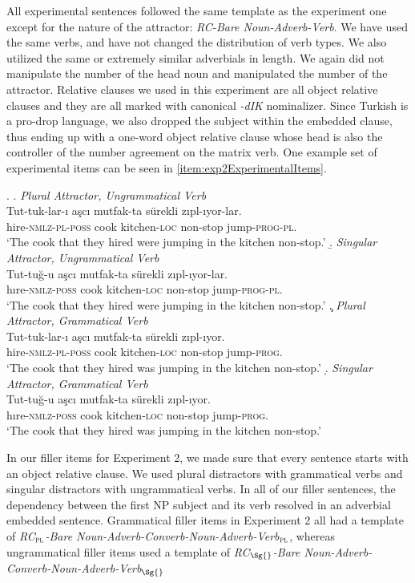 \documentclass[doc,a4paper,man,natbib,floatsintext,noextraspace]{apa6}\usepackage[]{graphicx}\usepackage[]{color}
\begin{document}
All experimental sentences followed the same template as the experiment one except for the nature of the attractor: \textit{RC-Bare Noun-Adverb-Verb}. 
We have used the same verbs, and have not changed the distribution of verb types. We also utilized the same or extremely similar adverbials in length. We again did not manipulate the number of the head noun and manipulated the number of the attractor. Relative clauses we used in this experiment are all object relative clauses and they are all marked with canonical \textit{-dIK} nominalizer. Since Turkish is a pro-drop language, we also dropped the subject within the embedded clause, thus ending up with a one-word object relative clause whose head is also the controller of the number agreement on the matrix verb. One example set of experimental items can be seen in \ref{item:exp2ExperimentalItems}.


\ex. \label{item:exp2ExperimentalItems}
\a. \textit{Plural Attractor, Ungrammatical Verb}\\ 
\gll *Tut-tuk-lar-ı aşcı mutfak-ta sürekli zıpl-ıyor-lar.\\ 
hire-\textsc{nmlz}-\textsc{pl}-\textsc{poss}  cook kitchen-\textsc{loc} non-stop  jump-\textsc{prog}-\textsc{pl}.\\
\glt `The cook that they hired were jumping in the kitchen non-stop.' 
\b. \textit{Singular Attractor, Ungrammatical Verb}\\ 
\gll *Tut-tuğ-u aşcı mutfak-ta sürekli zıpl-ıyor-lar.\\ 
hıre-\textsc{nmlz}-\textsc{poss}  cook kitchen-\textsc{loc} non-stop  jump-\textsc{prog}-\textsc{pl}.\\
\glt `The cook that they hired were jumping in the kitchen non-stop.'
\c. \textit{Plural Attractor, Grammatical Verb}\\ 
\gll Tut-tuk-lar-ı aşcı mutfak-ta sürekli zıpl-ıyor.\\ 
hire-\textsc{nmlz}-\textsc{pl}-\textsc{poss}  cook kitchen-\textsc{loc} non-stop  jump-\textsc{prog}.\\
\glt `The cook that they hired was jumping in the kitchen non-stop.'
\d. \textit{Singular Attractor, Grammatical Verb}\\ 
\gll Tut-tuğ-u aşcı mutfak-ta sürekli zıpl-ıyor.\\ 
hıre-\textsc{nmlz}-\textsc{poss}  cook kitchen-\textsc{loc} non-stop  jump-\textsc{prog}.\\
\glt `The cook that they hired was jumping in the kitchen non-stop.'

In our filler items for Experiment 2, we made sure that every sentence starts with an object relative clause. We used plural distractors with grammatical verbs and singular distractors with ungrammatical verbs. In all of our filler sentences, the dependency between the first NP subject and its verb resolved in an adverbial embedded sentence. Grammatical filler items in Experiment 2 all had a template of \textit{RC$_{\textsc{pl}}$-Bare Noun-Adverb-Converb-Noun-Adverb-Verb$_{\textsc{pl}}$}, whereas ungrammatical filler items used a template of \textit{RC$_{\Sg{}}$-Bare Noun-Adverb-Converb-Noun-Adverb-Verb$_{\Sg{}}$}
\end{document}
